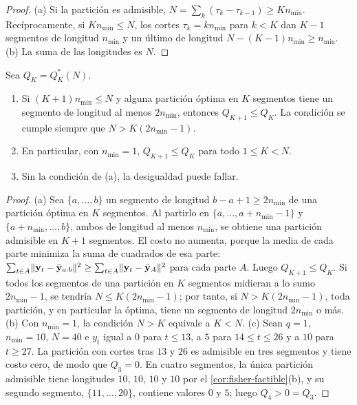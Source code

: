 \begin{proof}
(a) Si la partición es admisible, $N=\sum_k(\tau_k-\tau_{k-1})\ge Kn_{\min}$. Recíprocamente, si
$Kn_{\min}\le N$, los cortes $\tau_k=kn_{\min}$ para $k<K$ dan $K-1$ segmentos de longitud
$n_{\min}$ y un último de longitud $N-(K-1)n_{\min}\ge n_{\min}$. (b) La suma de las longitudes
es $N$.
\end{proof}

\begin{proposicion}\label{prop:fisher-monotonia}
Sea $Q_K=Q^\ast_K(N)$.
\begin{enumerate}[label=(\alph*)]
  \item Si $(K+1)n_{\min}\le N$ y alguna partición óptima en $K$ segmentos tiene un segmento de
    longitud al menos $2n_{\min}$, entonces $Q_{K+1}\le Q_K$. La condición se cumple siempre que
    $N>K(2n_{\min}-1)$.
  \item En particular, con $n_{\min}=1$, $Q_{K+1}\le Q_K$ para todo $1\le K<N$.
  \item Sin la condición de (a), la desigualdad puede fallar.
\end{enumerate}
\end{proposicion}

\begin{proof}
(a) Sea $\{a,\dots,b\}$ un segmento de longitud $b-a+1\ge2n_{\min}$ de una partición óptima en $K$
segmentos. Al partirlo en $\{a,\dots,a+n_{\min}-1\}$ y $\{a+n_{\min},\dots,b\}$, ambos de longitud
al menos $n_{\min}$, se obtiene una partición admisible en $K+1$ segmentos. El costo no aumenta,
porque la media de cada parte minimiza la suma de cuadrados de esa parte:
$\sum_{t\in A}\lVert \mathbf{y}_t-\bar{\mathbf{y}}_{a:b}\rVert^2\ge\sum_{t\in A}\lVert \mathbf{y}_t-\bar{\mathbf{y}}_A\rVert^2$ para cada parte
$A$. Luego $Q_{K+1}\le Q_K$. Si todos los segmentos de una partición en $K$ segmentos midieran a
lo sumo $2n_{\min}-1$, se tendría $N\le K(2n_{\min}-1)$; por tanto, si $N>K(2n_{\min}-1)$, toda
partición, y en particular la óptima, tiene un segmento de longitud $2n_{\min}$ o más.
(b) Con $n_{\min}=1$, la condición $N>K$ equivale a $K<N$. (c) Sean $q=1$, $n_{\min}=10$, $N=40$ e
$y_t$ igual a $0$ para $t\le13$, a $5$ para $14\le t\le26$ y a $10$ para $t\ge27$. La partición
con cortes tras $13$ y $26$ es admisible en tres segmentos y tiene costo cero, de modo que
$Q_3=0$. En cuatro segmentos, la única partición admisible tiene longitudes $10$, $10$, $10$ y
$10$ por el \cref{cor:fisher-factible}(b), y su segundo segmento, $\{11,\dots,20\}$, contiene
valores $0$ y $5$; luego $Q_4>0=Q_3$.
\end{proof}

